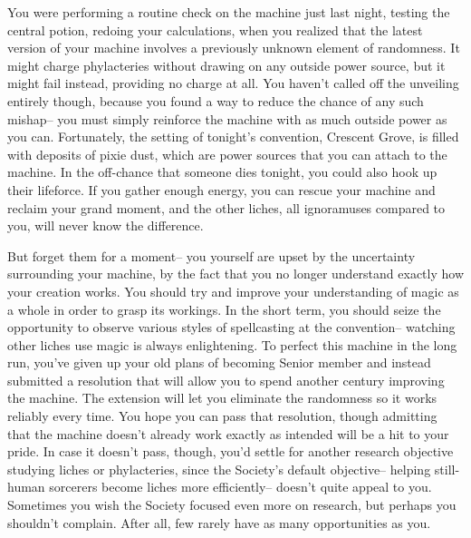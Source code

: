 \documentclass[char]{Sel}
\begin{document}
You were performing a routine check on the machine just last night, testing the central potion, redoing your calculations, when you realized that the latest version of your machine involves a previously unknown element of randomness. It might charge phylacteries without drawing on any outside power source, but it might fail instead, providing no charge at all. You haven't called off the unveiling entirely though, because you found a way to reduce the chance of any such mishap-- you must simply reinforce the machine with as much outside power as you can. Fortunately, the setting of tonight's convention, Crescent Grove, is filled with deposits of pixie dust, which are power sources that you can attach to the machine. In the off-chance that someone dies tonight, you could also hook up their lifeforce. If you gather enough energy, you can rescue your machine and reclaim your grand moment, and the other liches, all ignoramuses compared to you, will never know the difference.

But forget them for a moment-- you yourself are upset by the uncertainty surrounding your machine, by the fact that you no longer understand exactly how your creation works. You should try and improve your understanding of magic as a whole in order to grasp its workings. In the short term, you should seize the opportunity to observe various styles of spellcasting at the convention-- watching other liches use magic is always enlightening. To perfect this machine in the long run, you've given up your old plans of becoming Senior member and instead submitted a resolution that will allow you to spend another century improving the machine. The extension will let you eliminate the randomness so it works reliably every time. You hope you can pass that resolution, though admitting that the machine doesn't already work exactly as intended will be a hit to your pride. In case it doesn't pass, though, you'd settle for another research objective studying liches or phylacteries, since the Society’s default objective-- helping still-human sorcerers become liches more efficiently-- doesn’t quite appeal to you. Sometimes you wish the Society focused even more on research, but perhaps you shouldn't complain. After all, few rarely have as many opportunities as you.
\end{document}
